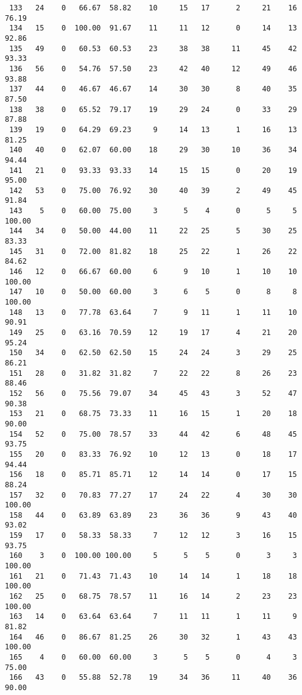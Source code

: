 \begin{verbatim}
 133   24    0   66.67  58.82    10     15   17      2     21    16    76.19
 134   15    0  100.00  91.67    11     11   12      0     14    13    92.86
 135   49    0   60.53  60.53    23     38   38     11     45    42    93.33
 136   56    0   54.76  57.50    23     42   40     12     49    46    93.88
 137   44    0   46.67  46.67    14     30   30      8     40    35    87.50
 138   38    0   65.52  79.17    19     29   24      0     33    29    87.88
 139   19    0   64.29  69.23     9     14   13      1     16    13    81.25
 140   40    0   62.07  60.00    18     29   30     10     36    34    94.44
 141   21    0   93.33  93.33    14     15   15      0     20    19    95.00
 142   53    0   75.00  76.92    30     40   39      2     49    45    91.84
 143    5    0   60.00  75.00     3      5    4      0      5     5   100.00
 144   34    0   50.00  44.00    11     22   25      5     30    25    83.33
 145   31    0   72.00  81.82    18     25   22      1     26    22    84.62
 146   12    0   66.67  60.00     6      9   10      1     10    10   100.00
 147   10    0   50.00  60.00     3      6    5      0      8     8   100.00
 148   13    0   77.78  63.64     7      9   11      1     11    10    90.91
 149   25    0   63.16  70.59    12     19   17      4     21    20    95.24
 150   34    0   62.50  62.50    15     24   24      3     29    25    86.21
 151   28    0   31.82  31.82     7     22   22      8     26    23    88.46
 152   56    0   75.56  79.07    34     45   43      3     52    47    90.38
 153   21    0   68.75  73.33    11     16   15      1     20    18    90.00
 154   52    0   75.00  78.57    33     44   42      6     48    45    93.75
 155   20    0   83.33  76.92    10     12   13      0     18    17    94.44
 156   18    0   85.71  85.71    12     14   14      0     17    15    88.24
 157   32    0   70.83  77.27    17     24   22      4     30    30   100.00
 158   44    0   63.89  63.89    23     36   36      9     43    40    93.02
 159   17    0   58.33  58.33     7     12   12      3     16    15    93.75
 160    3    0  100.00 100.00     5      5    5      0      3     3   100.00
 161   21    0   71.43  71.43    10     14   14      1     18    18   100.00
 162   25    0   68.75  78.57    11     16   14      2     23    23   100.00
 163   14    0   63.64  63.64     7     11   11      1     11     9    81.82
 164   46    0   86.67  81.25    26     30   32      1     43    43   100.00
 165    4    0   60.00  60.00     3      5    5      0      4     3    75.00
 166   43    0   55.88  52.78    19     34   36     11     40    36    90.00

\end{verbatim}
